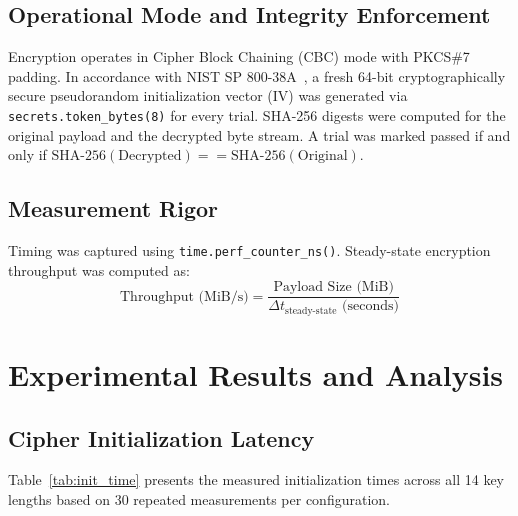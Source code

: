 \documentclass[conference]{IEEEtran}
\begin{document}
\subsection{Operational Mode and Integrity Enforcement}
Encryption operates in Cipher Block Chaining (CBC) mode with PKCS\#7 padding. In accordance with NIST SP 800-38A~\cite{dworkin2001nist}, a fresh 64-bit cryptographically secure pseudorandom initialization vector (IV) was generated via \texttt{secrets.token\_bytes(8)} for every trial. SHA-256 digests were computed for the original payload and the decrypted byte stream. A trial was marked passed if and only if $\text{SHA-256}(\text{Decrypted}) == \text{SHA-256}(\text{Original})$.

\subsection{Measurement Rigor}
Timing was captured using \texttt{time.perf\_counter\_ns()}. Steady-state encryption throughput was computed as:
\begin{equation}
\text{Throughput (MiB/s)} = \frac{\text{Payload Size (MiB)}}{\Delta t_{\text{steady-state}} \text{ (seconds)}}
\end{equation}

\section{Experimental Results and Analysis}

\subsection{Cipher Initialization Latency}
Table~\ref{tab:init_time} presents the measured initialization times across all 14 key lengths based on 30 repeated measurements per configuration.
\end{document}
